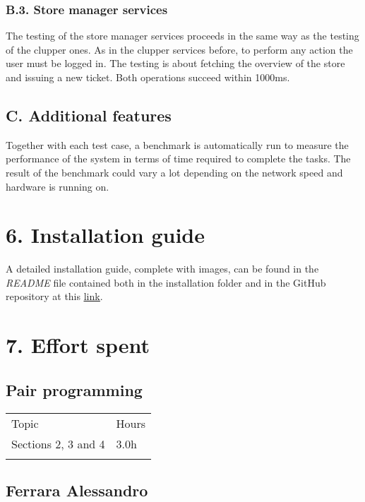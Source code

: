 \subsection{B.3. Store manager services}
The testing of the store manager services proceeds in the same way as the testing of the clupper ones.
As in the clupper services before, to perform any action the user must be logged in.
The testing is about fetching the overview of the store and issuing a new ticket. Both operations succeed within 1000ms.

\section{C. Additional features}

Together with each test case, a benchmark is automatically run to measure the performance of the system in terms of time required to complete the tasks.
The result of the benchmark could vary a lot depending on the network speed and hardware is running on.

\chapter{6. Installation guide}

A detailed installation guide, complete with images, can be found in the \emph{README} file contained both in the installation folder and in the GitHub repository at this \underline{\href{https://github.com/ferrohd/FerraraFratus/tree/main/CLup}{link}}.

\chapter{7. Effort spent}

\section{Pair programming}

\begin{longtable}[]{@{}
  >{\raggedright\arraybackslash}p{}
  >{\raggedleft\arraybackslash}p{}@{}}
\toprule
Topic & Hours \\ \addlinespace
\midrule
\endhead
Sections 2, 3 and 4 & 3.0h \\ \addlinespace
\bottomrule
\end{longtable}

\section{Ferrara Alessandro}

